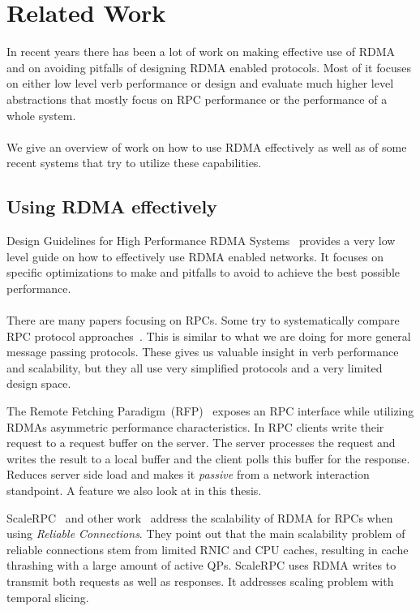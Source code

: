 \section{Related Work}

In recent years there has been a lot of work on making effective use of RDMA and on avoiding pitfalls of designing  
RDMA enabled protocols. Most of it focuses on either low level verb performance or design and evaluate much higher level
abstractions that mostly focus on RPC performance or the performance of a whole system.

\paragraph{} We give an overview of work on how to use RDMA effectively as well as of 
some recent systems that try to utilize these
capabilities.

\subsection{Using RDMA effectively}

Design Guidelines for High Performance RDMA Systems~\cite{anuj-guide} provides a very low level guide on how to
effectively use RDMA enabled networks. It focuses on specific optimizations to make and pitfalls to avoid to achieve the 
best possible performance. 

\paragraph{} There are many papers focusing on RPCs. Some try to systematically  compare RPC protocol
approaches~\cite{ziegler2020rdma,Huang2019AnEO}. This is similar to what we are doing for more general 
message passing protocols. These gives us valuable insight in verb performance and scalability, but they all use very 
simplified protocols and a very limited design space.

The Remote Fetching Paradigm~(RFP)~\cite{rfp} exposes an RPC interface while utilizing RDMAs asymmetric performance 
characteristics. In RPC clients write their request to a request buffer on the server. The server processes the request
and writes the result to a local buffer and the client polls this buffer for the response. Reduces server side load and 
makes it \emph{passive} from a network interaction standpoint. A feature we also look at in this thesis.

ScaleRPC~\cite{scalerpc} and other work~\cite{fasst, rfp, herd} address the scalability of RDMA for RPCs when using 
\emph{Reliable Connections}. They point out that the main scalability problem of reliable connections stem from limited 
RNIC and CPU caches, resulting in cache thrashing with a large amount of active QPs. ScaleRPC uses RDMA writes to 
transmit both requests as well as responses. It addresses scaling problem with temporal slicing.




